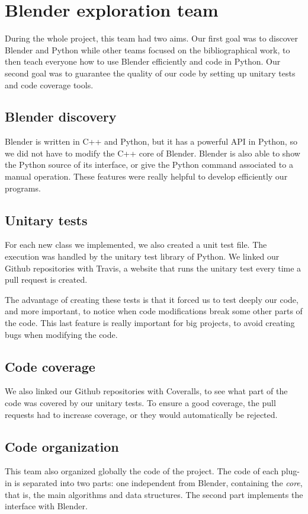 \section{Blender exploration team}

During the whole project, this team had two aims. Our first goal was
to discover Blender and Python while other teams focused on the
bibliographical work, to then teach everyone how to use Blender
efficiently and code in Python. Our second goal was to guarantee the
quality of our code by setting up unitary tests and code coverage
tools.

\subsection{Blender discovery}

Blender is written in C++ and Python, but it has a powerful API in
Python, so we did not have to modify the C++ core of Blender. Blender
is also able to show the Python source of its interface, or give the
Python command associated to a manual operation. These features were
really helpful to develop efficiently our programs.


\subsection{Unitary tests}

For each new class we implemented, we also created a unit test
file. The execution was handled by the unitary test library of
Python. We linked our Github repositories with Travis, a website
that runs the unitary test every time a pull request is created.

The advantage of creating these tests is that it forced us to test
deeply our code, and more important, to notice when code modifications
break some other parts of the code. This last feature is really
important for big projects, to avoid creating bugs when modifying the
code.

\subsection{Code coverage}

We also linked our Github repositories with Coveralls, to see what
part of the code was covered by our unitary tests. To ensure a good
coverage, the pull requests had to increase coverage, or they would
automatically be rejected.

\subsection{Code organization}
This team also organized globally the code of the project. The code of
each plug-in is separated into two parts: one independent from
Blender, containing the \textit{core}, that is, the main algorithms
and data structures. The second part implements the interface with
Blender.


